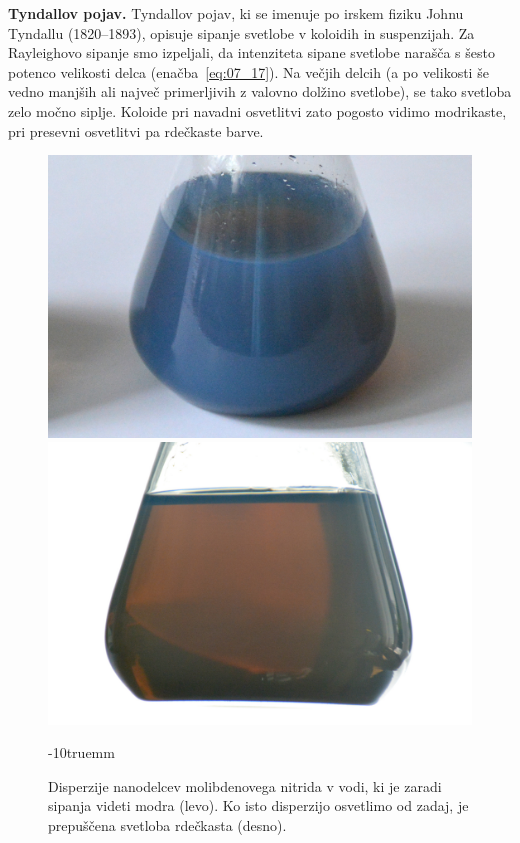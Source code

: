 \begin{example}{\bf Tyndallov pojav.} Tyndallov pojav, ki se imenuje po irskem fiziku
Johnu Tyndallu (1820--1893), opisuje sipanje svetlobe v koloidih in suspenzijah.
Za Rayleighovo
sipanje smo izpeljali, da intenziteta sipane svetlobe narašča s šesto potenco velikosti
delca (enačba~\ref{eq:07_17}). Na večjih delcih (a po velikosti še vedno manjših 
ali največ primerljivih z valovno dolžino 
svetlobe), se tako svetloba zelo močno siplje. Koloide pri navadni 
osvetlitvi zato pogosto vidimo modrikaste, pri presevni osvetlitvi pa rdečkaste barve.
\begin{figure}[!ht]
\centering
\includegraphics[width=7truecm]{slike/07_Mo2N1.jpg}\hfill
\includegraphics[width=7truecm]{slike/07_Mo2N2.jpg}
\caption{Disperzije nanodelcev molibdenovega nitrida v vodi, ki je zaradi sipanja
videti modra (levo). Ko isto disperzijo osvetlimo od zadaj, je prepuščena svetloba rdečkasta
(desno).}
\label{fig:07_Tyndall}
\vglue-10truemm
\end{figure}

\end{example}

